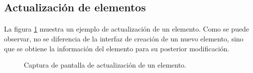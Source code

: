\subsection{Actualización de elementos}

  \paragraph{}La figura \ref{capturaActualizacionElementos} muestra un ejemplo
  de actualización de un elemento. Como se puede observar, no se diferencia
  de la interfaz de creación de un nuevo elemento, sino que se obtiene la
  información del elemento para su posterior modificación.


  \begin{figure}[!ht]
    \begin{center}
      \caption{Captura de pantalla de actualización de un elemento.}
      \label{capturaActualizacionElementos}
    \end{center}
  \end{figure}